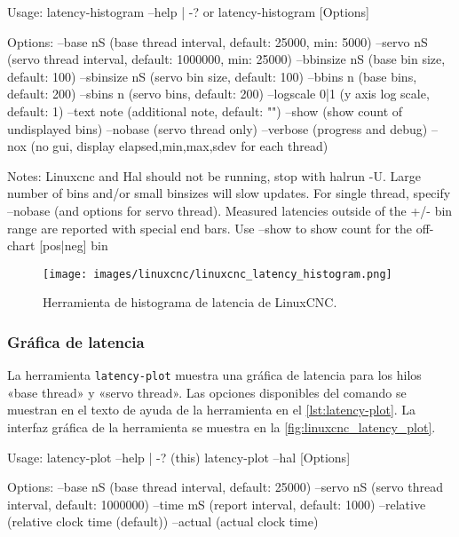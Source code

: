 \documentclass[english,spanish,a4paper,11pt]{article}
\begin{document}
\begin{listingtitledbox}[
    title=Texto de ayuda de la herramienta \texttt{latency-histogram}.,
    label=lst:latency-histogram,
][
    basicstyle=\ttfamily\footnotesize,
]
Usage:
   latency-histogram --help | -?
or
   latency-histogram [Options]

Options:
  --base      nS   (base  thread interval, default:   25000, min:  5000)
  --servo     nS   (servo thread interval, default: 1000000, min: 25000)
  --bbinsize  nS   (base  bin size,  default: 100)
  --sbinsize  nS   (servo bin size, default: 100)
  --bbins     n    (base  bins, default: 200)
  --sbins     n    (servo bins, default: 200)
  --logscale  0|1  (y axis log scale, default: 1)
  --text      note (additional note, default: "")
  --show           (show count of undisplayed bins)
  --nobase         (servo thread only)
  --verbose        (progress and debug)
  --nox            (no gui, display elapsed,min,max,sdev for each thread)

Notes:
  Linuxcnc and Hal should not be running, stop with halrun -U.
  Large number of bins and/or small binsizes will slow updates.
  For single thread, specify --nobase (and options for servo thread).
  Measured latencies outside of the +/- bin range are reported
  with special end bars.  Use --show to show count for
  the off-chart [pos|neg] bin
\end{listingtitledbox}


\begin{figure}[!ht]
    \centering
    \texttt{[image: images/linuxcnc/linuxcnc\_latency\_histogram.png]}
    \caption{Herramienta de histograma de latencia de LinuxCNC.}
    \label{fig:linuxcnc_latency_histogram}
\end{figure}


\subsubsection{Gráfica de latencia}

La herramienta \texttt{latency-plot} muestra una gráfica de latencia para los hilos «base thread» y «servo thread». Las opciones disponibles del comando se muestran en el texto de ayuda de la herramienta en el \cref{lst:latency-plot}. La interfaz gráfica de la herramienta se muestra en la \cref{fig:linuxcnc_latency_plot}.

\begin{listingtitledbox}[
    title=Texto de ayuda de la herramienta \texttt{latency-plot}.,
    label=lst:latency-plot,
][
    basicstyle=\ttfamily\footnotesize,
]
Usage:
      latency-plot --help | -?      (this)
      latency-plot --hal [Options]

Options:
      --base nS  (base  thread interval, default:   25000)
      --servo nS (servo thread interval, default: 1000000)
      --time mS  (report interval, default: 1000)
      --relative (relative clock time (default))
      --actual   (actual clock time)
\end{listingtitledbox}
\end{document}
